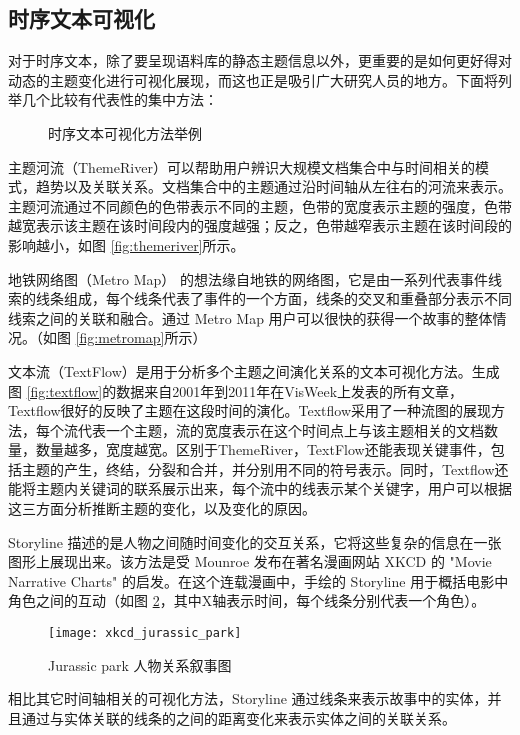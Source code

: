 \subsection{时序文本可视化}
对于时序文本，除了要呈现语料库的静态主题信息以外，更重要的是如何更好得对动态的主题变化进行可视化展现，而这也正是吸引广大研究人员的地方。下面将列举几个比较有代表性的集中方法：
\begin{figure}[htb]
    \centering
    
    \caption{时序文本可视化方法举例}
    \label{fig:temporal-theme-visual}
\end{figure}

主题河流（ThemeRiver）\cite{Havre:2000}可以帮助用户辨识大规模文档集合中与时间相关的模式，趋势以及关联关系。文档集合中的主题通过沿时间轴从左往右的河流来表示。主题河流通过不同颜色的色带表示不同的主题，色带的宽度表示主题的强度，色带越宽表示该主题在该时间段内的强度越强；反之，色带越窄表示主题在该时间段的影响越小，如图 \ref{fig:themeriver}所示。

地铁网络图（Metro Map）\cite{shahaf2012trains} 的想法缘自地铁的网络图，它是由一系列代表事件线索的线条组成，每个线条代表了事件的一个方面，线条的交叉和重叠部分表示不同线索之间的关联和融合。通过 Metro Map 用户可以很快的获得一个故事的整体情况。（如图 \ref{fig:metromap}所示）

文本流（TextFlow）\cite{Weiwei:2011}是用于分析多个主题之间演化关系的文本可视化方法。生成图 \ref{fig:textflow}的数据来自2001年到2011年在VisWeek上发表的所有文章，Textflow很好的反映了主题在这段时间的演化。Textflow采用了一种流图的展现方法，每个流代表一个主题，流的宽度表示在这个时间点上与该主题相关的文档数量，数量越多，宽度越宽。区别于ThemeRiver，TextFlow还能表现关键事件，包括主题的产生，终结，分裂和合并，并分别用不同的符号表示。同时，Textflow还能将主题内关键词的联系展示出来，每个流中的线表示某个关键字，用户可以根据这三方面分析推断主题的变化，以及变化的原因。

Storyline 描述的是人物之间随时间变化的交互关系，它将这些复杂的信息在一张图形上展现出来。该方法是受 Mounroe 发布在著名漫画网站 XKCD 的 "Movie Narrative Charts" \cite{xkcd657} 的启发。在这个连载漫画中，手绘的 Storyline 用于概括电影中角色之间的互动（如图 \ref{xkcd}，其中X轴表示时间，每个线条分别代表一个角色）。
\begin{figure}[htb]
    \centering
    \texttt{[image: xkcd\_jurassic\_park]}
    \caption{Jurassic park 人物关系叙事图}
    \label{xkcd}
\end{figure}
相比其它时间轴相关的可视化方法，Storyline 通过线条来表示故事中的实体，并且通过与实体关联的线条的之间的距离变化来表示实体之间的关联关系。

